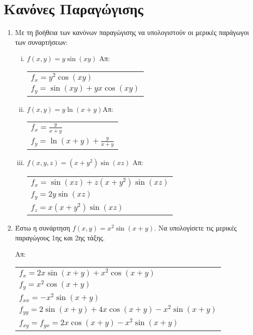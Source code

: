 



\pagestyle{askhseis}
\everymath{\displaystyle}



\begin{center}
  {\color{Col1}}
\end{center}

\section*{Κανόνες Παραγώγισης}

\begin{enumerate}
  \item Με τη βοήθεια των κανόνων παραγώγισης να υπολογιστούν οι μερικές 
    παράγωγοι των συναρτήσεων:

    \begin{enumerate}[i)]
      \item $f(x,y)=y\sin (xy)$ \hfill Απ: \begin{tabular}{l}
          $f_x=y^2\cos(xy)$ \\ 
          $f_y=\sin(xy)+yx\cos(xy)$
        \end{tabular}

      \item $f(x,y)=y\ln(x+y)$\hfill Απ: \begin{tabular}{l}
          $f_x=\frac{y}{x+y}$ \\ 
          $f_y=\ln(x+y)+\frac{y}{x+y}$
        \end{tabular}

      \item $ f(x,y,z) = (x+y^{2}) \sin{(xz)} $ \hfill Απ: \begin{tabular}{l}
          $ f_{x} = \sin{(xz)} + z(x+y^{2}) \sin{(xz)} $ \\
          $ f_{y} = 2y \sin{(xz)} $ \\
          $ f_{z} = x(x+y^{2}) \sin{(xz)} $
        \end{tabular} 
    \end{enumerate}

  \item Έστω η συνάρτηση $ f(x,y) = x^{2} \sin{(x+y)} $. Να υπολογίσετε τις μερικές 
    παραγώγους 1ης και 2ης τάξης.

    \hfill Απ: \begin{tabular}{l}
      $ f_{x} = 2x \sin{(x+y)} + x^{2} \cos{(x+y)} $ \\
      $ f_{y} = x^{2} \cos{(x+y)} $ \\
      $ f_{xx} =  -x^{2} \sin{(x+y)} $ \\
      $ f_{yy} = 2 \sin{(x+y)} + 4x \cos{(x+y)} -x^{2} \sin{(x+y)} $ \\
      $ f_{xy}=f_{yx} =  2x \cos{(x+y)} -x^{2} \sin{(x+y)} $
    \end{tabular}


\end{enumerate}
